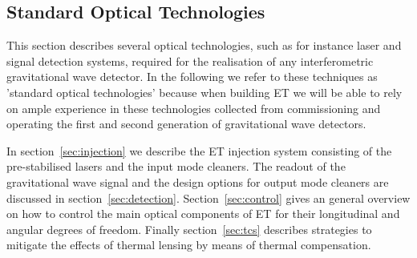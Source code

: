 \FloatBarrier

\subsection{Standard Optical Technologies}

This section describes several optical technologies, such as for instance laser and signal
detection systems, required for the realisation
of any interferometric gravitational wave detector.  In the following we refer to
these techniques as 'standard optical technologies' because when building ET
we will be able to rely on ample experience in these technologies collected 
from commissioning and operating the first and second generation of gravitational wave
detectors. 

In section~\ref{sec:injection} we describe the ET injection system consisting 
of the pre-stabilised lasers and the input mode cleaners. The readout of the 
gravitational wave signal and the design options for output mode cleaners are 
discussed in section~\ref{sec:detection}. Section~\ref{sec:control} gives an 
general overview on how to control the main optical components of ET for 
their longitudinal and angular degrees of freedom. Finally section~\ref{sec:tcs}
describes strategies to mitigate the effects of thermal lensing by means of 
thermal compensation. 








